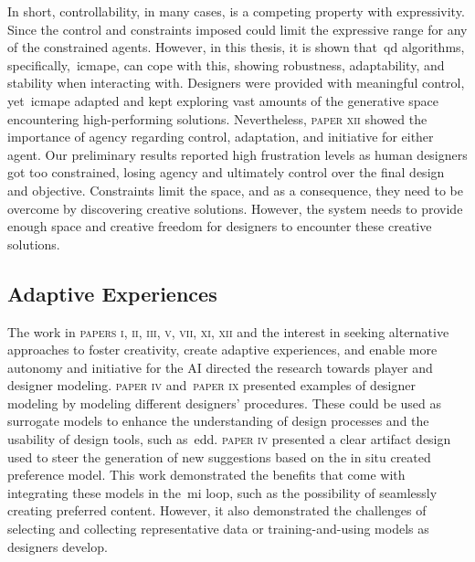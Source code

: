 

In short, controllability, in many cases, is a competing property with expressivity. Since the control and constraints imposed could limit the expressive range for any of the constrained agents. However, in this thesis, it is shown that~\acrshort{qd} algorithms, specifically,~\acrshort{icmape}, can cope with this, showing robustness, adaptability, and stability when interacting with. Designers were provided with meaningful control, yet~\acrshort{icmape} adapted and kept exploring vast amounts of the generative space encountering high-performing solutions. Nevertheless, \textsc{paper xii} showed the importance of agency regarding control, adaptation, and initiative for either agent. Our preliminary results reported high frustration levels as human designers got too constrained, losing agency and ultimately control over the final design and objective. Constraints limit the space, and as a consequence, they need to be overcome by discovering creative solutions. However, the system needs to provide enough space and creative freedom for designers to encounter these creative solutions.





\subsection{Adaptive Experiences}

The work in \textsc{papers i, ii, iii,  v, vii, xi, xii} and the interest in seeking alternative approaches to foster creativity, create adaptive experiences, and enable more autonomy and initiative for the AI directed the research towards player and designer modeling. \textsc{paper iv} and~\textsc{paper ix} presented examples of designer modeling by modeling different designers' procedures. These could be used as surrogate models to enhance the understanding of design processes and the usability of design tools, such as~\acrshort{edd}. \textsc{paper iv} presented a clear artifact design used to steer the generation of new suggestions based on the in situ created preference model. This work demonstrated the benefits that come with integrating these models in the~\acrshort{mi} loop, such as the possibility of seamlessly creating preferred content. However, it also demonstrated the challenges of selecting and collecting representative data or training-and-using models as designers develop.

